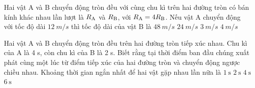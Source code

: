 \begin{ex}
	Hai vật A và B chuyển động tròn đều với cùng chu kì trên hai đường tròn có bán kính khác nhau lần lượt là $R_\text A$ và $R_\text B$, với $R_\text A = 4 R_\text B$. Nếu vật A chuyển động với tốc độ dài $\SI{12}{m/s}$ thì tốc độ dài của vật B là
	\choice
	{$\SI{48}{m/s}$}
	{$\SI{24}{m/s}$}
	{\True $\SI{3}{m/s}$}
	{$\SI{4}{m/s}$}
\end{ex}
\begin{ex}
	Hai vật A và B chuyển động tròn đều trên hai đường tròn tiếp xúc nhau. Chu kì của A là 4 s, còn chu kì của B là 2 s. Biết rằng tại thời điểm ban đầu chúng xuất phát cùng một lúc từ điểm tiếp xúc của hai đường tròn và chuyển động ngược chiều nhau. Khoảng thời gian ngắn nhất để hai vật gặp nhau lần nữa là
	\choice
	{$\SI{1}{\second}$}
	{$\SI{2}{\second}$}
	{\True $\SI{4}{\second}$}
	{$\SI{6}{\second}$}
\end{ex}
	
